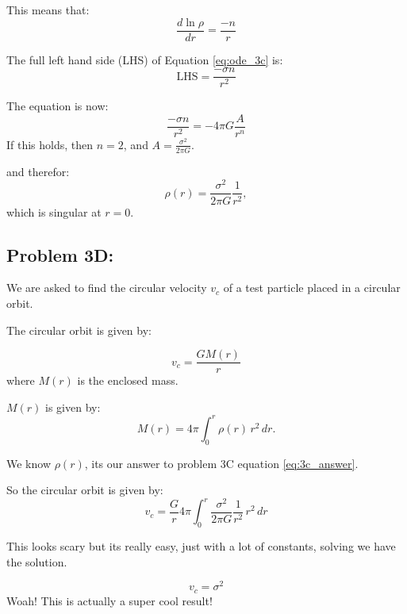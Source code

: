 This means that:
\begin{equation}
    \frac{d\ln{\rho}}{dr} = \frac{-n}{r}
\end{equation}

The full left hand side (LHS) of Equation \ref{eq:ode_3c} is:
\begin{equation}
    \mathrm{LHS} = \frac{-\sigma n}{r^2}
\end{equation}

The equation is now:
\begin{equation}
   \frac{-\sigma n}{r^2} = -4\pi G \frac{A}{r^n}
\end{equation}
If this holds, then $n=2$, and $A= \frac{\sigma^2}{2\pi G}$.

and therefor:
\begin{equation} \label{eq:3c_answer}
    \boxed{\rho(r) = \frac{\sigma^2}{2\pi G} \frac{1}{r^2}},
\end{equation}
which is singular at $r=0$. 

\subsection*{Problem 3D:}
We are asked to find the circular velocity $v_c$ of a test particle placed in a circular orbit. 


The circular orbit is given by:

\begin{equation}
    v_c = \frac{GM(r)}{r}
\end{equation}
where $M(r)$ is the enclosed mass. 

$M(r)$ is given by:
\begin{equation}
    M(r) = 4 \pi \int_0^r \rho(r) \, {r}^2 \, dr.
\end{equation}


We know $\rho(r)$, its our answer to problem 3C equation \ref{eq:3c_answer}. 

So the circular orbit is given by:
\begin{equation}
    v_c = \frac{G}{r} 4 \pi \int_0^r \frac{\sigma^2}{2\pi G} \frac{1}{r^2} \, {r}^2 \, dr
\end{equation}

This looks scary but its really easy, just with a lot of constants, solving we have the solution. 

\begin{equation}
    \boxed{v_c = \sigma^2}
\end{equation}
Woah! This is actually a super cool result! 


